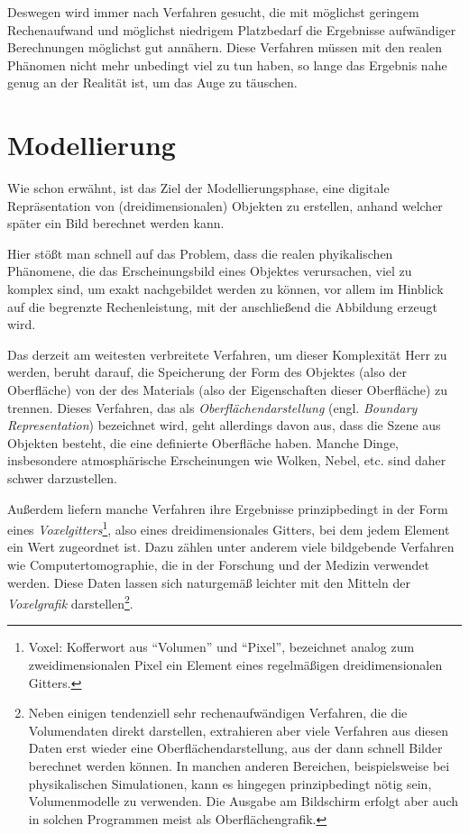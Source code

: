 Deswegen wird immer nach Verfahren gesucht, die mit möglichst geringem Rechenaufwand und möglichst niedrigem Platzbedarf die Ergebnisse aufwändiger Berechnungen möglichst gut annähern. Diese Verfahren müssen mit den realen Phänomen nicht mehr unbedingt viel zu tun haben, so lange das Ergebnis nahe genug an der Realität ist, um das Auge zu täuschen.

\section{Modellierung}
Wie schon erwähnt, ist das Ziel der Modellierungsphase, eine digitale Repräsentation von (dreidimensionalen) Objekten zu erstellen, anhand welcher später ein Bild berechnet werden kann.

Hier stößt man schnell auf das Problem, dass die realen phyikalischen Phänomene, die das Erscheinungsbild eines Objektes verursachen, viel zu komplex sind, um exakt nachgebildet werden zu können, vor allem im Hinblick auf die begrenzte Rechenleistung, mit der anschließend die Abbildung erzeugt wird.

Das derzeit am weitesten verbreitete Verfahren, um dieser Komplexität Herr zu werden, beruht darauf, die Speicherung der Form des Objektes (also der Oberfläche) von der des Materials (also der Eigenschaften dieser Oberfläche) zu trennen. Dieses Verfahren, das als \emph{Oberflächendarstellung} (engl. \emph{Boundary Representation}) bezeichnet wird, geht allerdings davon aus, dass die Szene aus Objekten besteht, die eine definierte Oberfläche haben. Manche Dinge, insbesondere atmosphärische Erscheinungen wie Wolken, Nebel, etc. sind daher schwer darzustellen.

Außerdem liefern manche Verfahren ihre Ergebnisse prinzipbedingt in der Form eines \emph{Voxelgitters}\footnote{Voxel: Kofferwort aus \enquote{Volumen} und \enquote{Pixel}, bezeichnet analog zum zweidimensionalen Pixel ein Element eines regelmäßigen dreidimensionalen Gitters.}, also eines dreidimensionales Gitters, bei dem jedem Element ein Wert zugeordnet ist. Dazu zählen unter anderem viele bildgebende Verfahren wie Computertomographie, die in der Forschung und der Medizin verwendet werden. Diese Daten lassen sich naturgemäß leichter mit den Mitteln der \emph{Voxelgrafik} darstellen\footnote{Neben einigen tendenziell sehr rechenaufwändigen Verfahren, die die Volumendaten direkt darstellen, extrahieren aber viele Verfahren aus diesen Daten erst wieder eine Oberflächendarstellung, aus der dann schnell Bilder berechnet werden können.
In manchen anderen Bereichen, beispielsweise bei physikalischen Simulationen, kann es hingegen prinzipbedingt nötig sein, Volumenmodelle zu verwenden. Die Ausgabe am Bildschirm erfolgt aber auch in solchen Programmen meist als Oberflächengrafik.}.

